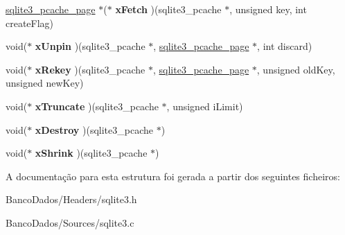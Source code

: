 \begin{DoxyCompactItemize}
\item 
\hypertarget{structsqlite3__pcache__methods2_ac74dd2b35193a4309494311995da2d25}{\hyperlink{structsqlite3__pcache__page}{sqlite3\-\_\-pcache\-\_\-page} $\ast$($\ast$ {\bfseries x\-Fetch} )(sqlite3\-\_\-pcache $\ast$, unsigned key, int create\-Flag)}\label{structsqlite3__pcache__methods2_ac74dd2b35193a4309494311995da2d25}

\item 
\hypertarget{structsqlite3__pcache__methods2_ac94294551eda282f17b1ed2a110e1850}{void($\ast$ {\bfseries x\-Unpin} )(sqlite3\-\_\-pcache $\ast$, \hyperlink{structsqlite3__pcache__page}{sqlite3\-\_\-pcache\-\_\-page} $\ast$, int discard)}\label{structsqlite3__pcache__methods2_ac94294551eda282f17b1ed2a110e1850}

\item 
\hypertarget{structsqlite3__pcache__methods2_a28a22927b108182e22025bbe6ba1f68e}{void($\ast$ {\bfseries x\-Rekey} )(sqlite3\-\_\-pcache $\ast$, \hyperlink{structsqlite3__pcache__page}{sqlite3\-\_\-pcache\-\_\-page} $\ast$, unsigned old\-Key, unsigned new\-Key)}\label{structsqlite3__pcache__methods2_a28a22927b108182e22025bbe6ba1f68e}

\item 
\hypertarget{structsqlite3__pcache__methods2_a7c565709ab91dbe7feb5b82c684ba604}{void($\ast$ {\bfseries x\-Truncate} )(sqlite3\-\_\-pcache $\ast$, unsigned i\-Limit)}\label{structsqlite3__pcache__methods2_a7c565709ab91dbe7feb5b82c684ba604}

\item 
\hypertarget{structsqlite3__pcache__methods2_a144d6e899889e80e00f93fb6c83359e2}{void($\ast$ {\bfseries x\-Destroy} )(sqlite3\-\_\-pcache $\ast$)}\label{structsqlite3__pcache__methods2_a144d6e899889e80e00f93fb6c83359e2}

\item 
\hypertarget{structsqlite3__pcache__methods2_af00c121e9c39b1df292711013c226ba5}{void($\ast$ {\bfseries x\-Shrink} )(sqlite3\-\_\-pcache $\ast$)}\label{structsqlite3__pcache__methods2_af00c121e9c39b1df292711013c226ba5}

\end{DoxyCompactItemize}


A documentação para esta estrutura foi gerada a partir dos seguintes ficheiros\-:\begin{DoxyCompactItemize}
\item 
Banco\-Dados/\-Headers/sqlite3.\-h\item 
Banco\-Dados/\-Sources/sqlite3.\-c\end{DoxyCompactItemize}
